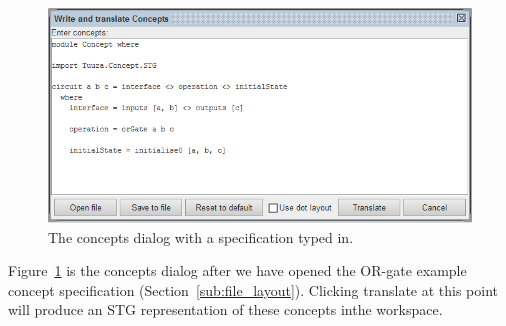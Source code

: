 \documentclass[british,conference,compsoc]{IEEEtran}
\begin{document}
\begin{figure}[h]
\begin{centering}
\includegraphics[scale=0.45]{Images/concepts_dialog_or_gate.png}
\par\end{centering}

\begin{centering}
\protect\caption{\label{fig:concepts_dialog_or_gate}The concepts dialog with a 
			specification typed in.}

\par\end{centering}
\end{figure}

Figure~\ref{fig:concepts_dialog_or_gate} is the concepts dialog after we have 
opened the OR-gate example concept specification 
(Section~\ref{sub:file_layout}). Clicking translate at this point will produce 
an STG representation of these concepts inthe workspace. 
\end{document}
